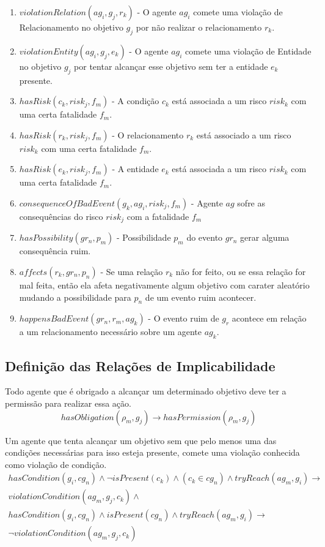 \documentclass[12pt]{article}
\begin{document}
\begin{enumerate}
	\item $violationRelation(ag_i,g_j,r_k)$ - O agente $ag_i$ comete uma violação de Relacionamento no objetivo $g_j$ por não realizar o relacionamento $r_k$. 
	\item $violationEntity(ag_i,g_j,e_k)$ - O agente $ag_i$ comete uma violação de Entidade no objetivo $g_j$ por tentar alcançar esse objetivo sem ter a entidade $e_k$ presente.  	
	\item $hasRisk(c_k,risk_j,f_m)$ - A condição $c_k$ está associada a um risco $risk_k$ com uma certa fatalidade $f_m$. 
	\item $hasRisk(r_k,risk_j,f_m)$ - O relacionamento $r_k$ está associado a um risco $risk_k$ com uma certa fatalidade $f_m$.
	\item $hasRisk(e_k,risk_j,f_m)$ - A entidade $e_k$ está associada a um risco $risk_k$ com uma certa fatalidade $f_m$.
	\item $consequenceOfBadEvent(g_k,ag_i,risk_j,f_m)$ - Agente $ag$ sofre as consequências do risco $risk_j$ com a fatalidade $f_m$
	\item $hasPossibility(gr_n,p_m)$ - Possibilidade $p_m$ do evento $gr_n$ gerar alguma consequência ruim. 	
	\item $affects(r_k,gr_n,p_n)$ - Se uma relação $r_k$ não for feito, ou se essa relação for mal feita, então ela afeta negativamente algum objetivo com carater aleatório mudando a possibilidade para $p_n$ de um evento ruim acontecer. 	
	\item $happensBadEvent(gr_n,r_m,ag_k)$ - O evento ruim de $g_r$ acontece em relação a um relacionamento necessário sobre um agente $ag_k$. 		
\end{enumerate}

\subsection{Definição das Relações de Implicabilidade}

Todo agente que é obrigado a alcançar um determinado objetivo deve ter a permissão para realizar essa ação.
\begin{equation}\label{rel1}
	hasObligation(\rho_m,g_j) \to hasPermission(\rho_m,g_j)  
\end{equation}

Um agente que tenta alcançar um objetivo sem que pelo menos uma das condições necessárias para isso esteja presente, comete uma violação conhecida como violação de condição.
\begin{eqnarray}\label{rel3}\nonumber
	hasCondition(g_i,cg_n) \wedge \neg isPresent(c_k) \wedge (c_k \in cg_n) \wedge tryReach(ag_m,g_i) \to \nonumber \\  
	violationCondition(ag_m,g_j,c_k) \wedge \nonumber \\
	hasCondition(g_i,cg_n) \wedge isPresent(cg_n) \wedge tryReach(ag_m,g_i) \to \nonumber \\  
	\neg violationCondition(ag_m,g_j,c_k)  	
\end{eqnarray}
\end{document}
